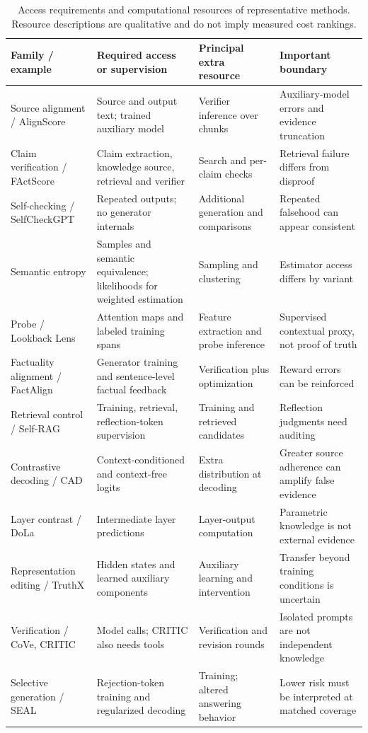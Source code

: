 \begin{table}[tp]
\centering\small\setlength{\tabcolsep}{4pt}\renewcommand{\arraystretch}{1.14}
\begin{tabularx}{\textwidth}{@{}p{}p{}p{}X@{}}\toprule
Family / example & Required access or supervision & Principal extra resource & Important boundary \\\midrule
Source alignment / AlignScore & Source and output text; trained auxiliary model & Verifier inference over chunks & Auxiliary-model errors and evidence truncation \\
Claim verification / FActScore & Claim extraction, knowledge source, retrieval and verifier & Search and per-claim checks & Retrieval failure differs from disproof \\
Self-checking / SelfCheckGPT & Repeated outputs; no generator internals & Additional generation and comparisons & Repeated falsehood can appear consistent \\
Semantic entropy & Samples and semantic equivalence; likelihoods for weighted estimation & Sampling and clustering & Estimator access differs by variant \\
Probe / Lookback Lens & Attention maps and labeled training spans & Feature extraction and probe inference & Supervised contextual proxy, not proof of truth \\
Factuality alignment / FactAlign & Generator training and sentence-level factual feedback & Verification plus optimization & Reward errors can be reinforced \\
Retrieval control / Self-RAG & Training, retrieval, reflection-token supervision & Training and retrieved candidates & Reflection judgments need auditing \\
Contrastive decoding / CAD & Context-conditioned and context-free logits & Extra distribution at decoding & Greater source adherence can amplify false evidence \\
Layer contrast / DoLa & Intermediate layer predictions & Layer-output computation & Parametric knowledge is not external evidence \\
Representation editing / TruthX & Hidden states and learned auxiliary components & Auxiliary learning and intervention & Transfer beyond training conditions is uncertain \\
Verification / CoVe, CRITIC & Model calls; CRITIC also needs tools & Verification and revision rounds & Isolated prompts are not independent knowledge \\
Selective generation / SEAL & Rejection-token training and regularized decoding & Training; altered answering behavior & Lower risk must be interpreted at matched coverage \\
\bottomrule\end{tabularx}
\caption{Access requirements and computational resources of representative methods. Resource descriptions are qualitative and do not imply measured cost rankings.}
\label{tab:access}
\end{table}

